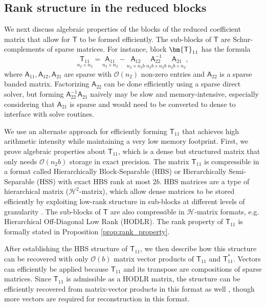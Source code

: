 \documentclass[11pt]{amsart}
\newcommand{\mtx}[1]{\bm{\mathsf{#1}}}
\begin{document}
\subsection{Rank structure in the reduced blocks}
\label{sec:rank_reduced}

We next discuss algebraic properties of the blocks of the reduced coefficient matrix that allow for $\mtx T$ to be formed efficiently. The sub-blocks of $\mtx T$ are Schur-complements of sparse matrices. For instance, block $\mtx T_{\rm 11}$
has the formula
\begin{equation}\underset{n_2 \times n_2}{\mtx T_{11}} = \underset{n_2 \times n_2}{\mtx A_{11}} - \underset{n_2 \times n_2 b} {\mtx A_{12}}\ 
\underset{n_2 b \times n_2 b} {\mtx A_{22}^{-1}}\ \underset{n_2 b \times n_2} {\mtx A_{21}},
\label{eq:T11_detailed}
\end{equation}
where $\mtx A_{11}, \mtx A_{12}, \mtx A_{21}$ are sparse with $\mathcal O(n_2)$ non-zero entries and $\mtx A_{22}$ is a sparse banded matrix. 
Factorizing $\mtx A_{22}$ can be done efficiently using a sparse direct solver, 
but forming $\mtx A_{22}^{-1} \mtx A_{21}$ naively may be slow and memory-intensive, especially considering that 
$\mtx A_{21}$ is sparse and would need to be converted to dense to interface with solve routines. 

We use an alternate approach for efficiently forming $\mtx T_{11}$ that achieves high arithmetic intensity
while maintaining a very low memory footprint. First, we prove algebraic properties about $\mtx T_{11}$, which is a
dense but structured matrix that only needs $\mathcal O(n_2 b)$ storage 
in exact precision. 
The matrix $\mtx T_{11}$ is compressible in a format called Hierarchically Block-Separable (HBS) or Hierarchically
Semi-Separable (HSS) with exact HBS rank at most $2b$. 
HBS matrices are a type of hierarchical matrix ($\mathcal H^2$-matrix), which allow dense matrices to be stored efficiently
by exploiting low-rank structure in sub-blocks at different levels of granularity \cite{2008_bebendorf_book,hackbusch2015hierarchical,2019_martinsson_book}.
The sub-blocks of $\mtx T$ are also compressible in $\mathcal H$-matrix formats, e.g. Hierarchical Off-Diagonal Low Rank (HODLR). 
The rank property of $\mtx T_{11}$ is formally stated in Proposition \ref{prop:rank_property}.

After establishing the HBS structure of $\mtx T_{11}$, we then 
describe how this structure can be recovered with only $\mathcal O(b)$ matrix vector products
of $\mtx T_{11}$ and $\mtx T_{11}^*$. Vectors can efficiently be applied 
because $\mtx T_{11}$ and its transpose are compositions of sparse matrices.
Since $\mtx T_{11}$ is admissible as a HODLR matrix, the structure can be efficiently recovered from matrix-vector products in this format as well
 \cite{2011_lin_lu_ying,2016_martinsson_hudson2}, though more vectors are required for reconstruction in this format.
\end{document}
